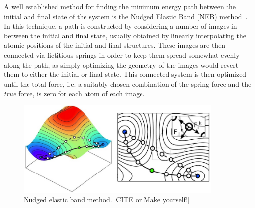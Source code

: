 \begin{refsection}
A well established method for finding the minimum energy path between the 
initial and final state of the system is the Nudged Elastic Band (NEB) 
method~\cite{Jonsson1998, Henkelman2000}. In this technique, a path is 
constructed by considering a number of images in between the initial and final 
state, usually obtained by linearly interpolating the atomic positions of the initial and final 
structures. These images are then connected via fictitious springs in order to keep 
them spread somewhat evenly along the path, as simply optimizing the geometry 
of the images would revert them to either the initial or final state. This 
connected system is then optimized until the total force, i.e. a suitably 
chosen combination of the spring force and the \textit{true} force, is zero 
for each atom of each image.

\begin{figure}[ht] 
\centering
\includegraphics[width=0.9\textwidth]{figures/DFT/neb.jpg} 
\caption{\label{dft:fig-neb} Nudged elastic band method. [CITE or Make yourself!]} 
\end{figure} 


\end{refsection}
